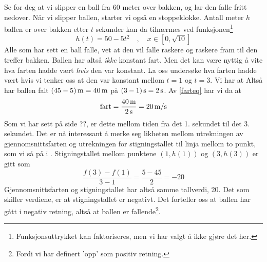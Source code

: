 




Se for deg at vi slipper en ball fra 60 meter over bakken, og lar den falle fritt nedover. Når vi slipper ballen, starter vi også en stoppeklokke. Antall meter $ h $ ballen er over bakken etter $ t $ sekunder kan da tilnærmes ved funksjonen\footnote{Funksjonsuttrykket kan faktoriseres, men vi har valgt å ikke gjøre det her.}
\[ h(t)=50-5t^2\quad,\quad x\in\left[0, \sqrt{10}\right] \]
Alle som har sett en ball falle, vet at den vil falle raskere og raskere fram til den treffer bakken. Ballen har altså \textit{ikke} konstant fart. Men det kan være nyttig å vite hva farten hadde vært \textit{hvis} den var konstant. La oss undersøke hva farten hadde vært hvis vi tenker oss at den var konstant mellom $ t=1 $ og $ t=3 $.
Vi har at
Altså har ballen falt $ {(45-5)\,\textrm{m}=40\,\textrm{m}} $ på $ (3-1)\,\textrm{s}=2\,\textrm{s} $. Av \eqref{farteq} har vi da at
\[ \text{fart}=\frac{40\,\textrm{m}}{2\,\textrm{s}}=20\,\textrm{m/s} \]
Som vi har sett på side ??, er dette  mellom tiden fra det 1. sekundet til det 3. sekundet. \newpage
Det er nå interessant å merke seg likheten mellom utrekningen av gjennomsnittsfarten og utrekningen for stigningstallet til linja mellom to punkt, som vi så på i \mb. Stigningstallet mellom punktene $ (1, h(1)) $ og $ (3, h(3)) $ er gitt som
\[ \frac{f(3)-f(1)}{3-1}=\frac{5-45}{2}=-20 \]
Gjennomsnittsfarten og stigningstallet har altså samme tallverdi, 20. Det som skiller verdiene, er at stigningstallet er negativt. Det forteller oss at ballen har gått i negativ retning, altså at ballen er fallende\footnote{Fordi vi har definert 'opp' som positiv retning.}. 



